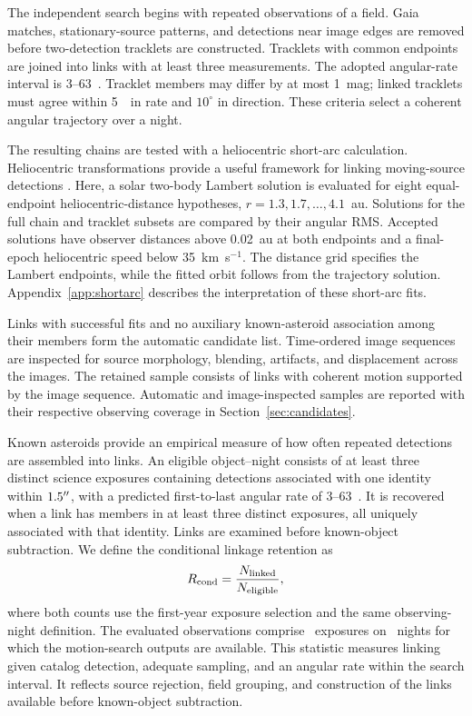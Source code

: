 \label{sec:motion_method}
The independent search begins with repeated observations of a field.
Gaia matches, stationary-source patterns, and detections near image
edges are removed before two-detection tracklets are constructed.
Tracklets with common endpoints are joined into links with at least
three measurements. The adopted angular-rate interval is
$3$--$63$~\rateunit. Tracklet members may differ by at most 1~mag;
linked tracklets must agree within 5~\rateunit\ in rate and
$10^\circ$ in direction. These criteria select a coherent angular
trajectory over a night.

The resulting chains are tested with a heliocentric short-arc
calculation. Heliocentric transformations provide a useful framework
for linking moving-source detections \citep{Holman2018}. Here, a
solar two-body Lambert solution \citep{Izzo2015} is evaluated for
eight equal-endpoint heliocentric-distance hypotheses,
$r=1.3,1.7,\ldots,4.1$~au. Solutions for the full chain and tracklet
subsets are compared by their angular RMS. Accepted solutions have
observer distances above 0.02~au at both endpoints and a final-epoch
heliocentric speed below 35~km~s$^{-1}$. The distance grid specifies
the Lambert endpoints, while the fitted orbit follows from the
trajectory solution. Appendix~\ref{app:shortarc} describes the
interpretation of these short-arc fits.

Links with successful fits and no auxiliary known-asteroid association
among their members form the automatic candidate list. Time-ordered
image sequences are inspected for source morphology, blending,
artifacts, and displacement across the images. The retained sample
consists of links with coherent motion supported by the image
sequence. Automatic and image-inspected samples are reported with
their respective observing coverage in Section~\ref{sec:candidates}.

\label{sec:retention_method}
Known asteroids provide an empirical measure of how often repeated
detections are assembled into links. An eligible object--night consists
of at least three distinct science exposures containing detections
associated with one identity within $1.5^{\prime\prime}$, with a predicted
first-to-last angular rate of $3$--$63$~\rateunit. It is recovered
when a link has members in at least three distinct exposures, all
uniquely associated with that identity. Links are examined before
known-object subtraction.
We define the conditional linkage retention as
\begin{equation}
R_{\rm cond}=\frac{N_{\rm linked}}{N_{\rm eligible}},
\label{eq:retention}
\end{equation}
where both counts use the first-year exposure selection and the same
observing-night definition. The evaluated observations comprise
\yrNRetExposures\ exposures on \yrNRetNights\ nights for which the
motion-search outputs are available. This statistic measures linking
given catalog detection, adequate sampling, and an angular rate within
the search interval. It reflects source rejection, field grouping,
and construction of the links available before known-object subtraction.
